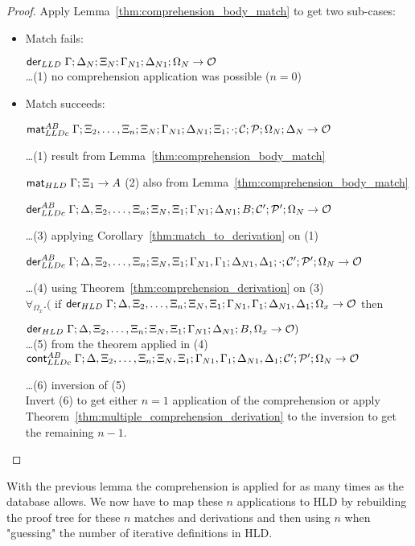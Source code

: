 \begin{proof}
Apply Lemma~\ref{thm:comprehension_body_match} to get two sub-cases:
   
\begin{itemize}[leftmargin=*]
   \item Match fails:
   
   
   $\mathsf{der}_{LLD} \; \Gamma; \Delta_N; \Xi_N; \Gamma_{N1}; \Delta_{N1}; \Omega_N
   \rightarrow \mathcal{O}$\\
   \dots \hfill (1) no comprehension application was possible ($n = 0$)\\
   
   \item Match succeeds:
   
   $\mathsf{mat}_{LLDc}^{AB} \; \Gamma; \Xi_2, \dotsc, \Xi_n; \Xi_N; \Gamma_{N1}; \Delta_{N1};
\Xi_1; \cdot; \mathcal{C}; \mathcal{P}; \Omega_N; \Delta_N \rightarrow \mathcal{O}$
   
   \dots \hfill (1) result from Lemma~\ref{thm:comprehension_body_match}
   
   $\mathsf{mat}_{HLD} \; \Gamma; \Xi_1 \rightarrow A$
   \hfill (2) also from Lemma~\ref{thm:comprehension_body_match}
   
   $\mathsf{der}_{LLDc}^{AB} \; \Gamma; \Delta, \Xi_2, \dotsc, \Xi_n; \Xi_N, \Xi_1; \Gamma_{N1}; \Delta_{N1}; B; \mathcal{C'};
\mathcal{P'}; \Omega_N \rightarrow \mathcal{O}$
   
   \dots \hfill (3) applying Corollary~\ref{thm:match_to_derivation} on (1)
   
   $\mathsf{der}_{LLDc}^{AB} \; \Gamma; \Delta, \Xi_2, \dotsc, \Xi_n; \Xi_N, \Xi_1; \Gamma_{N1}, \Gamma_1; \Delta_{N1}, \Delta_1;
   \cdot; \mathcal{C'}; \mathcal{P'}; \Omega_N \rightarrow \mathcal{O}$
   
   \dots \hfill (4) using Theorem~\ref{thm:comprehension_derivation} on (3)\\
   
   $\forall_{\Omega_x}. ($ if $\mathsf{der}_{HLD} \; \Gamma; \Delta, \Xi_2, \dotsc, \Xi_n; \Xi_N,
         \Xi_1; \Gamma_{N1}, \Gamma_1; \Delta_{N1}, \Delta_1; \Omega_x
         \rightarrow \mathcal{O}$ then
   
    \hspace*{0.5cm} $\mathsf{der}_{HLD} \; \Gamma; \Delta, \Xi_2, \dotsc, \Xi_n; \Xi_N, \Xi_1; \Gamma_{N1};
    \Delta_{N1}; B, \Omega_x \rightarrow \mathcal{O})$ \\ \dots \hfill (5)
   from the theorem applied in (4)\\
   
   $\mathsf{cont}_{LLDc}^{AB} \; \Gamma; \Delta, \Xi_2, \dotsc, \Xi_n; \Xi_N, \Xi_1; \Gamma_{N1},
   \Gamma_1; \Delta_{N1}, \Delta_1; \mathcal{C'}; \mathcal{P'}; \Omega_N \rightarrow \mathcal{O}$
   
   \dots \hfill (6) inversion of (5)\\
   
   Invert (6) to get either $n = 1$ application of the comprehension or apply Theorem~\ref{thm:multiple_comprehension_derivation} to the inversion to get the remaining $n-1$. 
\end{itemize}
\end{proof}

With the previous lemma the comprehension is applied for as many times as the
database allows. We now have to map these $n$ applications to HLD by rebuilding
the proof tree for these $n$ matches and derivations and then using
$n$ when "guessing" the number of iterative definitions in HLD.
